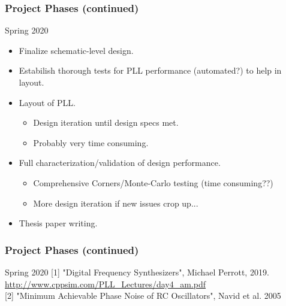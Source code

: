 \documentclass[t, screen, aspectratio=43]{beamer}
\begin{document}


\begin{frame}
	\frametitle{Project Phases (continued)}
	\begin{block}{Spring 2020}
		\begin{itemize}
			\footnotesize
			\item Finalize schematic-level design.
			\item Estabilish thorough tests for PLL performance (automated?) to help in layout.
			\item Layout of PLL.
			\begin{itemize}
				\footnotesize
				\item Design iteration until design specs met.
				\item Probably very time consuming.
			\end{itemize}
			\item Full characterization/validation of design performance. 
			\begin{itemize}
				\footnotesize
				\item Comprehensive Corners/Monte-Carlo testing (time consuming??)
				\item More design iteration if new issues crop up...
			\end{itemize}
			\item Thesis paper writing.
		\end{itemize}
	\end{block}
\end{frame}



\begin{frame}
	\frametitle{Project Phases (continued)}
	\begin{block}{Spring 2020}
		[1] "Digital Frequency Synthesizers", Michael Perrott, 2019.\\
		\hspace{16pt}\url{http://www.cppsim.com/PLL_Lectures/day4_am.pdf}\\
		\vspace{1em}
		[2] "Minimum Achievable Phase Noise of RC Oscillators",
	Navid et al. 2005
	\end{block}
\end{frame}
\end{document}
